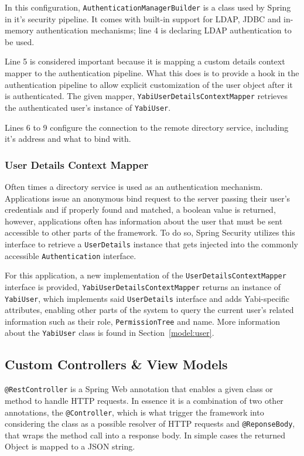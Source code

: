 

In this configuration, \texttt{AuthenticationManagerBuilder} is a class used by Spring in it's security pipeline. It comes with built-in support for \gls{LDAP}, \gls{JDBC} and in-memory authentication mechanisms; line 4 is declaring \gls{LDAP} authentication to be used.

Line 5 is considered important because it is mapping a custom details context mapper to the authentication pipeline. What this does is to provide a hook in the authentication pipeline to allow explicit customization of the user object after it is authenticated. The given mapper, \texttt{YabiUserDetailsContextMapper} retrieves the authenticated user's instance of \texttt{YabiUser}.

Lines 6 to 9 configure the connection to the remote directory service, including it's address and what to bind with.

\subsubsection{User Details Context Mapper}\label{impl:detailsmapper}
Often times a directory service is used as an authentication mechanism. Applications issue an anonymous bind request to the server passing their user's credentials and if properly found and matched, a boolean value is returned, however, applications often has information about the user that must be sent accessible to other parts of the framework. To do so, Spring Security utilizes this interface to retrieve a \texttt{UserDetails} instance that gets injected into the commonly accessible \texttt{Authentication} interface.

For this application, a new implementation of the \texttt{UserDetailsContextMapper} interface is provided, \texttt{YabiUserDetailsContextMapper} returns an instance of \texttt{YabiUser}, which implements said \texttt{UserDetails} interface and adds \gls{Yabi}-specific attributes, enabling other parts of the system to query the current user's related information such as their role, \texttt{PermissionTree} and name. More information about the \texttt{YabiUser} class is found in Section~\ref{model:user}.

\subsection{Custom Controllers \& View Models}
\texttt{@RestController} is a Spring Web annotation that enables a given class or method to handle \gls{HTTP} requests. In essence it is a combination of two other annotations, the \texttt{@Controller}, which is what trigger the framework into considering the class as a possible resolver of  \gls{HTTP} requests and \texttt{@ReponseBody}, that wraps the method call into a response body. In simple cases the returned Object is mapped to a \gls{JSON} string.

